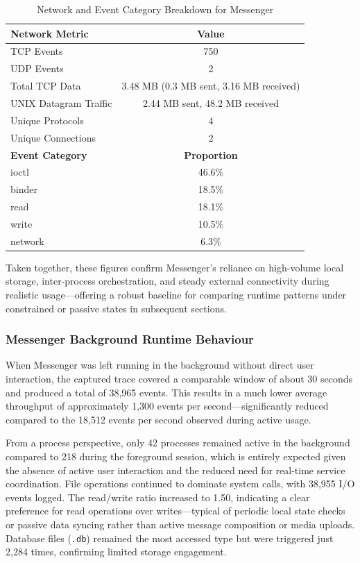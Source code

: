 \documentclass[a4paper,12pt]{report}
\begin{document}
\begin{table}[H]
    \centering
    \caption{Network and Event Category Breakdown for Messenger}
    \label{tab:messenger_network_category}
    \begin{tabular}{|l|c|}
        \hline
        \textbf{Network Metric} & \textbf{Value} \\
        \hline
        TCP Events & 750 \\
        UDP Events & 2 \\
        Total TCP Data & 3.48 MB (0.3 MB sent, 3.16 MB received) \\
        UNIX Datagram Traffic & 2.44 MB sent, 48.2 MB received \\
        Unique Protocols & 4 \\
        Unique Connections & 2 \\
        \hline
        \textbf{Event Category} & \textbf{Proportion} \\
        \hline
        ioctl & 46.6\% \\
        binder & 18.5\% \\
        read & 18.1\% \\
        write & 10.5\% \\
        network & 6.3\% \\
        \hline
    \end{tabular}
\end{table}

Taken together, these figures confirm Messenger’s reliance on high-volume local storage, inter-process orchestration, and steady external connectivity during realistic usage—offering a robust baseline for comparing runtime patterns under constrained or passive states in subsequent sections.

\subsubsection{Messenger Background Runtime Behaviour}

When Messenger was left running in the background without direct user interaction, the captured trace covered a comparable window of about 30 seconds and produced a total of 38,965 events. This results in a much lower average throughput of approximately 1,300 events per second—significantly reduced compared to the 18,512 events per second observed during active usage.

From a process perspective, only 42 processes remained active in the background compared to 218 during the foreground session, which is entirely expected given the absence of active user interaction and the reduced need for real-time service coordination. File operations continued to dominate system calls, with 38,955 I/O events logged. The read/write ratio increased to 1.50, indicating a clear preference for read operations over writes—typical of periodic local state checks or passive data syncing rather than active message composition or media uploads. Database files (\texttt{.db}) remained the most accessed type but were triggered just 2,284 times, confirming limited storage engagement.
\end{document}
